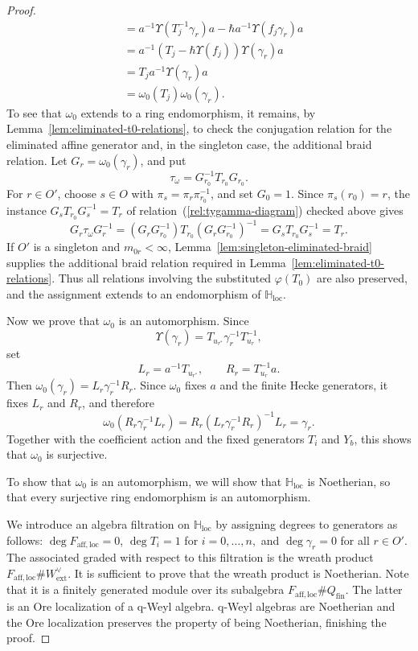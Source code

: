 \documentclass{amsart}
\theoremstyle{definition}
\numberwithin{equation}{section}
\begin{document}
\begin{proof}
\begin{align*}
        & = a^{-1}\Upsilon(T_j^{-1}\gamma_r)a - \hbar a^{-1}\Upsilon(f_j\gamma_r)a\\
        & = a^{-1}(T_j - \hbar \Upsilon(f_j))\Upsilon(\gamma_r)a\\
        & = T_ja^{-1}\Upsilon(\gamma_r)a\\
        & = \omega_0(T_j)\omega_0(\gamma_r).
    \end{align*}
   To see that $\omega_0$ extends to a ring endomorphism, it remains, by Lemma~\ref{lem:eliminated-t0-relations}, to check the
    conjugation relation for the eliminated affine generator and, in the
    singleton case, the additional braid relation. Let
    \(G_r=\omega_0(\gamma_r)\), and put
    \[
    \tau_\omega=G_{r_0}^{-1}T_{r_0}G_{r_0}.
    \]
    For \(r\in O'\), choose \(s\in O\) with \(\pi_s=\pi_r\pi_{r_0}^{-1}\), and
    set \(G_0=1\). Since \(\pi_s(r_0)=r\), the instance
    \(G_sT_{r_0}G_s^{-1}=T_r\) of relation~(\ref{rel:tygamma-diagram}) checked
    above gives
    \[
    G_r\tau_\omega G_r^{-1}
    =(G_rG_{r_0}^{-1})T_{r_0}(G_rG_{r_0}^{-1})^{-1}
    =G_sT_{r_0}G_s^{-1}
    =T_r.
    \]
    If \(O'\) is a singleton and \(m_{0r}<\infty\),
    Lemma~\ref{lem:singleton-eliminated-braid} supplies the additional braid
    relation required in Lemma~\ref{lem:eliminated-t0-relations}.
    Thus all relations involving the substituted \(\varphi(T_0)\) are also preserved, and
    the assignment extends to an endomorphism of $\mathbb H_{\mathrm{loc}}$.

    Now we prove that $\omega_0$ is an automorphism. Since
    \[
    \Upsilon(\gamma_r)
    =
    T_{u_{r^*}}\gamma_r^{-1}T_{u_r}^{-1},
    \]
    set
    \[
    L_r=a^{-1}T_{u_{r^*}},
    \qquad
    R_r=T_{u_r}^{-1}a.
    \]
    Then \(\omega_0(\gamma_r)=L_r\gamma_r^{-1}R_r\). Since
    \(\omega_0\) fixes \(a\) and the finite Hecke generators, it fixes
    \(L_r\) and \(R_r\), and therefore
    \[
    \omega_0(R_r\gamma_r^{-1}L_r)
    =
    R_r(L_r\gamma_r^{-1}R_r)^{-1}L_r
    =
    \gamma_r.
    \]
    Together with the coefficient action and the fixed generators \(T_i\) and
    \(Y_b\), this shows that \(\omega_0\) is surjective. 
    
    To show that $\omega_0$ is an automorphism, we will show that
    \(\mathbb H_{\mathrm{loc}}\) is Noetherian, so that every surjective ring endomorphism
    is an automorphism. 

    We introduce an algebra filtration on $\mathbb H_{\mathrm{loc}}$ by assigning degrees to generators as follows: $\deg F_{\mathrm{aff},\mathrm{loc}}=0$, $\deg T_i=1$ for $i=0,\ldots,n,$ and $\deg \gamma_r=0$ for all $r\in O'$. The associated graded with respect to this filtration is the wreath product $F_{\mathrm{aff},\mathrm{loc}}\# W^\vee_{\mathrm{ext}}$. It is sufficient to prove that the wreath product is Noetherian. Note that it is a finitely generated module over its  subalgebra $F_{\mathrm{aff},\mathrm{loc}}\#Q_{\mathrm{fin}}$. The latter is an Ore localization of a q-Weyl algebra. q-Weyl algebras are Noetherian and the Ore localization preserves the property of being Noetherian, finishing the proof. 
    

\end{proof}
\end{document}
